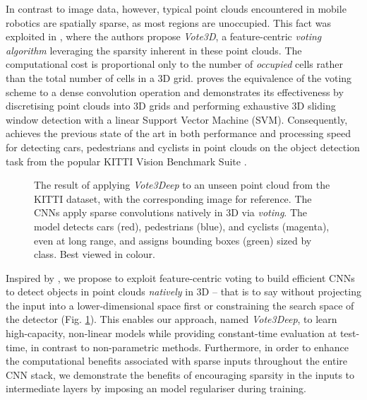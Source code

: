 \documentclass[letterpaper, 10 pt, conference]{tex_style/ieeeconf}
\begin{document}
In contrast to image data, however, typical point clouds encountered in mobile robotics are spatially sparse, as most regions are unoccupied.
This fact was exploited in \cite{wang2015voting}, where the authors propose \emph{Vote3D}, a feature-centric \emph{voting algorithm} leveraging the sparsity inherent in these point clouds.
The computational cost is proportional only to the number of \emph{occupied} cells rather than the total number of cells in a 3D grid.
\cite{wang2015voting} proves the equivalence of the voting scheme to a dense convolution operation and demonstrates its effectiveness by discretising point clouds into 3D grids and performing exhaustive 3D sliding window detection with a linear Support Vector Machine (SVM). Consequently, \cite{wang2015voting} achieves the previous state of the art in both performance and processing speed for detecting cars, pedestrians and cyclists in point clouds on the object detection task from the popular KITTI Vision Benchmark Suite \cite{Geiger2012CVPR}.

\begin{figure}[t]
    \parbox[t]{\columnwidth}{
    \centering
{}
    \caption{The result of applying \emph{Vote3Deep} to an unseen point cloud from the KITTI dataset, with the corresponding image for reference. The CNNs apply sparse convolutions natively in 3D via \emph{voting}. The model detects cars (red), pedestrians (blue), and cyclists (magenta), even at long range, and assigns bounding boxes (green) sized by class. Best viewed in colour.}
    \label{fig:pc_detections}}
\end{figure}

Inspired by \cite{wang2015voting}, we propose to exploit feature-centric voting to build efficient CNNs to detect objects in point clouds \emph{natively} in 3D -- that is to say without projecting the input into a lower-dimensional space first or constraining the search space of the detector (Fig. \ref{fig:pc_detections}).
This enables our approach, named \emph{Vote3Deep}, to learn high-capacity, non-linear models while providing constant-time evaluation at test-time, in contrast to non-parametric methods.
Furthermore, in order to enhance the computational benefits associated with sparse inputs throughout the entire CNN stack, we demonstrate the benefits of encouraging sparsity in the inputs to intermediate layers by imposing an  model regulariser during training.
\end{document}
